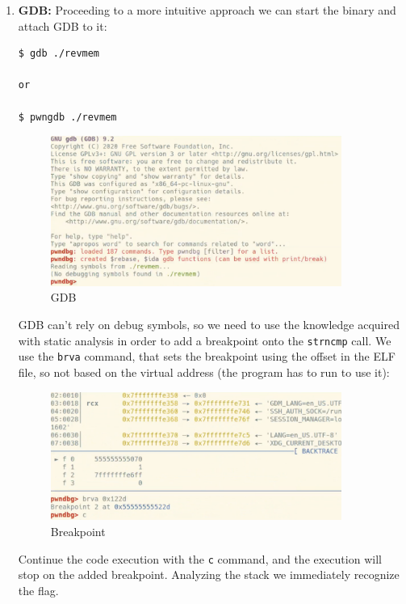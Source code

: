 \documentclass{article}
\begin{document}
\begin{enumerate}
\item{\textbf{GDB:}}
\noindent\linebreak
Proceeding to a more intuitive approach we can start the binary and attach GDB to it:
\begin{verbatim}
$ gdb ./revmem

or

$ pwngdb ./revmem
\end{verbatim}
\begin{figure}[H]
\centering
\includegraphics[width=0.9\textwidth]{img/gdb_1.pdf}
\caption{GDB}
\label{fig:gdb_1}
\end{figure}
\pagebreak
\noindent\linebreak
GDB can't rely on debug symbols, so we need to use the knowledge acquired with static analysis in order to
add a breakpoint onto the \texttt{strncmp} call.
We use the \texttt{brva} command, that sets the breakpoint using the offset in the ELF file,
so not based on the virtual address (the program has to run to use it):
\begin{figure}[H]
\centering
\includegraphics[width=0.9\textwidth]{img/gdb_2.pdf}
\caption{Breakpoint}
\label{fig:gdb_2}
\end{figure}

\noindent\linebreak
Continue the code execution with the \texttt{c} command, and the execution will stop on the added breakpoint. Analyzing the
stack we immediately recognize the flag. 


\end{enumerate}
\end{document}
